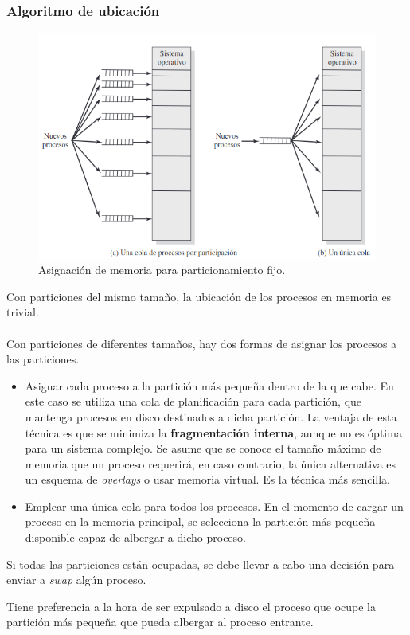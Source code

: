 \documentclass[12pt,a4paper]{article}
\begin{document}
\subsubsection{Algoritmo de ubicación}
\begin{figure}[H]
    \centering
    \includegraphics[width=12cm]{particionfija2.png}\par
    \caption{Asignación de memoria para particionamiento fijo.}
\end{figure}
Con particiones del mismo tamaño, la ubicación de los procesos en memoria es trivial.\\\\ 
Con particiones de diferentes tamaños, hay dos formas de asignar los procesos a las particiones. \\ 
\begin{itemize}
    \item Asignar cada proceso a la partición más pequeña dentro de la que cabe. En este caso se utiliza una cola de planificación para cada partición, que mantenga procesos en disco destinados a dicha partición. La ventaja de esta técnica es que se minimiza la \textbf{fragmentación interna}, aunque no es óptima para un sistema complejo. Se asume que se conoce el tamaño máximo de memoria que un proceso requerirá, en caso contrario, la única alternativa es un esquema de \textit{overlays} o usar memoria virtual. Es la técnica más sencilla.
    \item Emplear una única cola para todos los procesos. En el momento de cargar un proceso en la memoria principal, se selecciona la partición más pequeña disponible capaz de albergar a dicho proceso.
\end{itemize}
Si todas las particiones están ocupadas, se debe llevar a cabo una decisión para enviar a \textit{swap} algún proceso.
\begin{tcolorbox}[colback=cyan!10, colframe=blue!70, title=Nota]
    Tiene preferencia a la hora de ser expulsado a disco el proceso que ocupe la partición más pequeña que pueda albergar al proceso entrante.
\end{tcolorbox}
\end{document}
